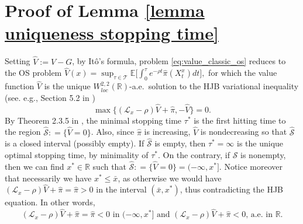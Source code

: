 \documentclass[11pt]{amsart}
\theoremstyle{plain}
\def \R{\mathbb{R}}
\numberwithin{equation}{section}
\begin{document}
\newpage


\appendix
\section{Proof of Lemma \ref{lemma uniqueness stopping time}}\label{appendix proof uniqueness stopping time}

Setting $\hat V := V -G $, by It\^o's formula, problem \eqref{eq:value_classic_os} reduces to the OS problem
$
\hat V (x) = \sup_{\tau \in \mathcal T} \mathbb E \big[ \int_0^\tau e^{-\rho t} \hat \pi ( X_t^x) dt  \big],
$ 
for which the value function  $\hat V$ is the unique $W^{2,2}_{loc}(\R)$-a.e.\ solution to the HJB variational inequality (see. e.g., Section 5.2 in \cite{pham2009continuous})
\begin{equation}
\max \big\{ \left(\mathcal{L}_{x} -\rho \right) \hat V  + \hat \pi  , - \hat V \big\}=0.
\end{equation}
By Theorem 2.3.5 in \cite{lamberton.2009optimal}, the minimal stopping time $\tau^*$ is the first hitting time to the region  $\hat{\mathcal S} : = \{ \hat V = 0 \}$. 
Also, since $\hat \pi $ is increasing, $\hat V$ is nondecreasing so that $\hat{\mathcal S}$ is a closed interval (possibly empty). 
If $\hat{\mathcal S}$ is empty, then $\tau^* = \infty$ is the unique optimal stopping time, by minimality of $\tau^*$.
On the contrary, if  $\hat{\mathcal S}$ is nonempty, then we can find $x^* \in \R$ such that $\hat{\mathcal S} : = \{ \hat V = 0 \} = (-\infty, x^* ]$.
Notice moreover that necessarily we have $x^* \leq \bar x$, as otherwise we would have $(\mathcal L_x - \rho) \hat V + \hat \pi = \hat \pi > 0$ in the interval $(\bar x, x^*)$, thus contradicting the HJB equation.
In other words, 
\begin{equation} 
    \label{eq negative pi}
    \text{$(\mathcal L_x - \rho) \hat V + \hat \pi = \hat \pi < 0$ in $(-\infty,x^*]$ and $(\mathcal L_x - \rho) \hat V + \hat \pi < 0$, a.e.\ in $\mathbb R$.}
\end{equation}
\end{document}
